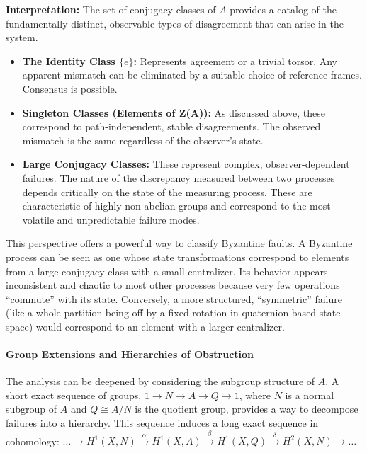 \documentclass[
]{article}
\providecommand{\tightlist}{%
  \setlength{\itemsep}{0pt}\setlength{\parskip}{0pt}}
\begin{document}
\textbf{Interpretation:} The set of conjugacy classes of \(A\) provides
a catalog of the fundamentally distinct, observable types of
disagreement that can arise in the system.

\begin{itemize}
\tightlist
\item
  \textbf{The Identity Class \(\{e\}\):} Represents agreement or a
  trivial torsor. Any apparent mismatch can be eliminated by a suitable
  choice of reference frames. Consensus is possible.
\item
  \textbf{Singleton Classes (Elements of Z(A)):} As discussed above,
  these correspond to path-independent, stable disagreements. The
  observed mismatch is the same regardless of the observer's state.
\item
  \textbf{Large Conjugacy Classes:} These represent complex,
  observer-dependent failures. The nature of the discrepancy measured
  between two processes depends critically on the state of the measuring
  process. These are characteristic of highly non-abelian groups and
  correspond to the most volatile and unpredictable failure modes.
\end{itemize}

This perspective offers a powerful way to classify Byzantine faults. A
Byzantine process can be seen as one whose state transformations
correspond to elements from a large conjugacy class with a small
centralizer. Its behavior appears inconsistent and chaotic to most other
processes because very few operations ``commute'' with its state.
Conversely, a more structured, ``symmetric'' failure (like a whole
partition being off by a fixed rotation in quaternion-based state space)
would correspond to an element with a larger centralizer.

\paragraph{Group Extensions and Hierarchies of
Obstruction}\label{group-extensions-and-hierarchies-of-obstruction}

The analysis can be deepened by considering the subgroup structure of
\(A\). A short exact sequence of groups, \(1 \to N \to A \to Q \to 1\),
where \(N\) is a normal subgroup of \(A\) and \(Q \cong A/N\) is the
quotient group, provides a way to decompose failures into a hierarchy.
This sequence induces a long exact sequence in cohomology:
\(\dots \to H^1(X, N) \xrightarrow{\alpha} H^1(X, A) \xrightarrow{\beta} H^1(X, Q) \xrightarrow{\delta} H^2(X, N) \to \dots\)
\end{document}
